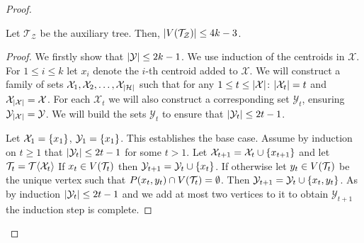 \begin{theorem}
\begin{proof}
\begin{lemma}\label{lemma:auxTreeSize}
    Let $\mathcal{T}_{\mathcal{Z}}$ be the auxiliary tree. Then, $\mathopen{}\left| V\mathopen{}\left( \mathcal{T}_{\mathcal{Z}} \right) \right|\leq 4k-3$.
    \begin{proof}
        We firstly show that $\mathopen{}\left| \mathcal{Y} \right|\leq 2k-1$. We use induction of the centroids in $\mathcal{X}$. For $1\leq i\leq k$ let $x_i$ denote the $i$-th centroid added to $\mathcal{X}$. We will construct a family of sets $\mathcal{X}_1, \mathcal{X}_2,\dots, \mathcal{X}_{\mathopen{}\left| \mathcal{H} \right|}$ such that for any $1\leq t\leq \mathopen{}\left| \mathcal{X} \right|$: $\mathopen{}\left| \mathcal{X}_t \right|=t$ and $\mathcal{X}_{\mathopen{}\left| \mathcal{X} \right|}=\mathcal{X}$. For each $\mathcal{X}_t$ we will also construct a corresponding set $\mathcal{Y}_t$, ensuring $\mathcal{Y}_{\mathopen{}\left| \mathcal{X} \right|}=\mathcal{Y}$. We will build the sets $\mathcal{Y}_{t}$ to ensure that $\mathopen{}\left| \mathcal{Y}_t \right|\leq 2t-1$. 
        
        Let $\mathcal{X}_1=\mathopen{}\left\{ x_1 \right\}$, $\mathcal{Y}_1=\mathopen{}\left\{ x_1 \right\}$. This establishes the base case. Assume by induction on $t\geq1$ that $\mathopen{}\left| \mathcal{Y}_t \right|\leq 2t-1$ for some $t>1$. Let $\mathcal{X}_{t+1} =\mathcal{X}_{t}\cup \mathopen{}\left\{ x_{t+1} \right\}$ and let $\mathcal{T}_t=\mathcal{T}\mathopen{}\langle \mathcal{X}_{t} \rangle$ If $x_t\in V\mathopen{}\left( \mathcal{T}_t \right)$ then $\mathcal{Y}_{t+1}=\mathcal{Y}_{t}\cup \mathopen{}\left\{ x_t \right\}$. If otherwise let $y_t \in V\mathopen{}\left( \mathcal{T}_t \right)$ be the unique vertex such that $P\mathopen{}\left( x_t, y_t \right)\cap V\mathopen{}\left( \mathcal{T}_t \right)=\emptyset$. Then $\mathcal{Y}_{t+1}=\mathcal{Y}_{t}\cup \mathopen{}\left\{ x_t, y_t \right\}$. As by induction $\mathopen{}\left| \mathcal{Y}_{t} \right|\leq 2t-1$ and we add at most two vertices to it to obtain $\mathcal{Y}_{t+1}$ the induction step is complete.
        

\end{proof}
\end{lemma}
\end{proof}
\end{theorem}
